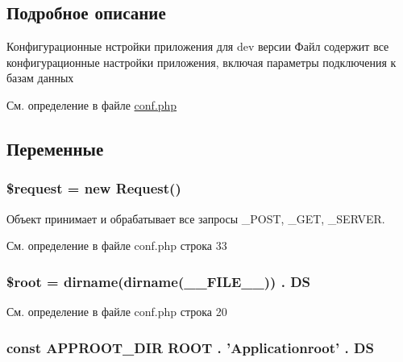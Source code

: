 \subsection{Подробное описание}
Конфигурационные нстройки приложения для dev версии Файл содержит все конфигурационные настройки приложения, включая параметры подключения к базам данных 

См. определение в файле \hyperlink{conf_8php_source}{conf.\-php}



\subsection{Переменные}
\hypertarget{conf_8php_abb35c8495a232b510389fa6d7b15d38a}{
\subsubsection[{\$request}]{\setlength{\rightskip}{0pt plus 5cm}\$request = new {\bf Request}()}}\label{conf_8php_abb35c8495a232b510389fa6d7b15d38a}


Объект принимает и обрабатывает все запросы \-\_\-\-P\-O\-S\-T, \-\_\-\-G\-E\-T, \-\_\-\-S\-E\-R\-V\-E\-R. 



См. определение в файле conf.\-php строка 33

\hypertarget{conf_8php_ab37f7c32f41c3c61ed940887453767f4}{
\subsubsection[{\$root}]{\setlength{\rightskip}{0pt plus 5cm}\$root = dirname(dirname(\-\_\-\-\_\-\-F\-I\-L\-E\-\_\-\-\_\-)) . {\bf D\-S}}}\label{conf_8php_ab37f7c32f41c3c61ed940887453767f4}


См. определение в файле conf.\-php строка 20

\hypertarget{conf_8php_ae32575aa3e9747cd2ffbf47d3bd53850}{
\subsubsection[{A\-P\-P\-R\-O\-O\-T\-\_\-\-D\-I\-R}]{\setlength{\rightskip}{0pt plus 5cm}const A\-P\-P\-R\-O\-O\-T\-\_\-\-D\-I\-R {\bf R\-O\-O\-T} . 'Applicationroot' . {\bf D\-S}}}\label{conf_8php_ae32575aa3e9747cd2ffbf47d3bd53850}


